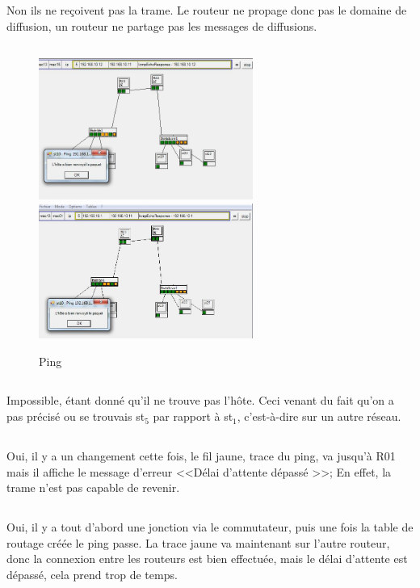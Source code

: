 \documentclass[a4paper, 11pt]{article}
\begin{document}
	\subsection{}
	Non ils ne reçoivent pas la trame. Le routeur ne propage donc pas le domaine de diffusion,
	un routeur ne partage pas les messages de diffusions.
	\subsection{}
		\begin{figure}[H]
			\centering
			\includegraphics[width=7cm]{5.jpg}
			\includegraphics[width=7cm]{6.jpg}
			\caption{Ping}
		\end{figure}
		\subsection{}
		Impossible, étant donné qu'il ne trouve pas l'hôte. Ceci venant du fait qu'on a pas
		précisé ou se trouvais st$_5$ par rapport à st$_1$, c'est-à-dire sur un autre réseau.
		\subsection{}Oui, il y a un changement cette fois, le fil jaune, trace du ping, va
		jusqu'à R01 mais il affiche le message d'erreur <<Délai d'attente dépassé >>; En
		effet, la trame n'est pas capable de revenir.
		\subsection{}
		Oui, il y a tout d'abord une jonction via le commutateur, puis une fois la table de
		routage créée le ping passe. La trace jaune va maintenant sur l'autre routeur, donc la
		connexion entre les routeurs est bien effectuée, mais le délai d'attente est dépassé,
		cela prend trop de temps.
\end{document}
